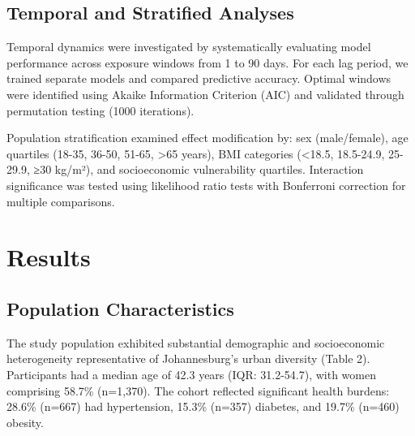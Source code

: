 \documentclass[11pt,a4paper]{article}
\begin{document}
\subsection{Temporal and Stratified Analyses}

Temporal dynamics were investigated by systematically evaluating model performance across exposure windows from 1 to 90 days. For each lag period, we trained separate models and compared predictive accuracy. Optimal windows were identified using Akaike Information Criterion (AIC) and validated through permutation testing (1000 iterations).

Population stratification examined effect modification by: sex (male/female), age quartiles (18-35, 36-50, 51-65, >65 years), BMI categories (<18.5, 18.5-24.9, 25-29.9, ≥30 kg/m²), and socioeconomic vulnerability quartiles. Interaction significance was tested using likelihood ratio tests with Bonferroni correction for multiple comparisons.

\section{Results}

\subsection{Population Characteristics}

The study population exhibited substantial demographic and socioeconomic heterogeneity representative of Johannesburg's urban diversity (Table 2). Participants had a median age of 42.3 years (IQR: 31.2-54.7), with women comprising 58.7\% (n=1,370). The cohort reflected significant health burdens: 28.6\% (n=667) had hypertension, 15.3\% (n=357) diabetes, and 19.7\% (n=460) obesity.
\end{document}
